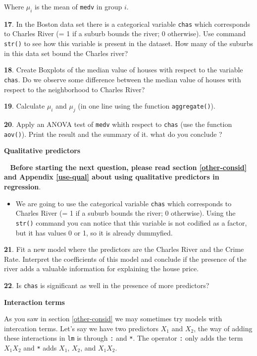 \documentclass[]{book}
\newenvironment{rmdblock}[1]
  {\begin{shaded*}
  \begin{itemize}
  \renewcommand{\labelitemi}{
    \raisebox{-.7\height}[0pt][0pt]{
      {\setkeys{Gin}{width=2em,keepaspectratio}\texttt{[image: img/icons/\#1]}}
    }
  }
  \item
  }
  {
  \end{itemize}
  \end{shaded*}
  }
\newenvironment{rmdinsight}
  {\begin{rmdblock}{insight}}
  {\end{rmdblock}}
\theoremstyle{definition}
\theoremstyle{definition}
\theoremstyle{definition}
\theoremstyle{remark}
\begin{document}
Where \(\mu_i\) is the mean of \texttt{medv} in group \(i\).

\textbf{17}. In the Boston data set there is a categorical variable
\texttt{chas} which corresponds to Charles River (= 1 if a suburb bounds
the river; 0 otherwise). Use command \texttt{str()} to see how this
variable is present in the dataset. How many of the suburbs in this data
set bound the Charles river?

\textbf{18}. Create Boxplots of the median value of houses with respect
to the variable \texttt{chas}. Do we observe some difference between the
median value of houses with respect to the neighborhood to Charles
River?

\textbf{19}. Calculate \(\mu_i\) and \(\mu_j\) (in one line using the
function \texttt{aggregate()}).

\textbf{20}. Apply an ANOVA test of \texttt{medv} whith respect to
\texttt{chas} (use the function \texttt{aov()}). Print the result and
the summary of it. what do you conclude ?

\textbf{Qualitative predictors}

\textcolor{white}{[}\faExclamationTriangle\textcolor{white}{]}
\textbf{Before starting the next question, please read section
\ref{other-consid} and Appendix \ref{use-qual} about using qualitative
predictors in regression}.

\begin{rmdinsight}
We are going to use the categorical variable \texttt{chas} which
corresponds to Charles River (= 1 if a suburb bounds the river; 0
otherwise). Using the \texttt{str()} command you can notice that this
variable is not codified as a factor, but it has values 0 or 1, so it is
already dummyfied.
\end{rmdinsight}

\textbf{21}. Fit a new model where the predictors are the Charles River
and the Crime Rate. Interpret the coefficients of this model and
conclude if the presence of the river adds a valuable information for
explaining the house price.

\textbf{22}. Is \texttt{chas} is significant as well in the presence of
more predictors?

\textbf{Interaction terms}

As you saw in section \ref{other-consid} we may sometimes try models
with intercation terms. Let's say we have two predictors \(X_1\) and
\(X_2\), the way of adding these interactions in \texttt{lm} is through
\texttt{:} and \texttt{*}. The operator \texttt{:} only adds the term
\(X_1X_2\) and \texttt{*} adds \(X_1\), \(X_2\), and \(X_1X_2\).
\end{document}
